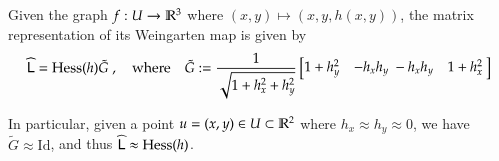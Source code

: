        	\begin{theorem}
        	Given the graph $f: U \to \mathbb{R}^3$ where $(x,y) \mapsto (x, y, h(x,y))$, the matrix
        	representation of its Weingarten map is given by
        	\begin{equation} \label{weinmatexactgraph}
        	\widehat{\mathsf{L}} = \mathrm{Hess}(h) \tilde{G} \;,\quad \mathrm{where} \quad
	        	\tilde{G} := \frac{1}{\sqrt{1+h_x^2 + h_y^2}}
	        	\begin{bmatrix}
		        	1 + h_y^2 & -h_x h_y \
		        	-h_x h_y & 1 + h_x^2 \
	        	\end{bmatrix} 
        	\end{equation}
        	
        	In particular, given a point $u = (x,y) \in U \subset \mathbb{R}^2$ where $h_x \approx h_y \approx 0$, we
        	have $\tilde{G} \approx \mathrm{Id}$, and thus $\widehat{\mathsf{L}} \approx \mathrm{Hess}(h)$.
        	
       	\end{theorem}
